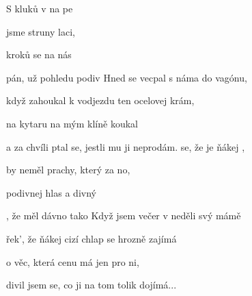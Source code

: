 

\zs
S  kluků v  na pe

 jsme  struny  laci,

 kroků  se na nás 

 pán, už  pohledu  
podiv
\ks
\zs
Hned se vecpal s náma do vagónu,

když zahoukal k vodjezdu ten ocelovej krám,

na kytaru na mým klíně koukal

a za chvíli ptal se, jestli mu ji neprodám.
\ks
\zr
{} se, že je ňákej ,

 by neměl prachy, který  za no,

 podivnej hlas a divný 

, že měl  dávno  tako
\kr
\zs
{}
\ks
\zr  \kr
\zs
Když jsem večer v neděli svý mámě

řek', že ňákej cizí chlap se hrozně zajímá

o věc, která cenu má jen pro ni,

divil jsem se, co ji na tom tolik dojímá...
\ks
\kp







